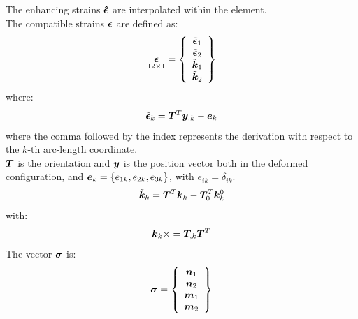 The enhancing strains $\T{\hat{\epsilon}}$ are interpolated within the element.\\
The compatible strains $\T{\epsilon}$ are defined as:
\begin{equation}
\underset{ 12 \times 1 }{
 \T{\epsilon}
 } =
\cubr{\vvect{c}{
 \tilde{\T{\epsilon}}_1 \\
 \tilde{\T{\epsilon}}_2 \\
 \tilde{\T{k} }_1 \\
 \tilde{\T{k} }_2 \\
}}
\end{equation}
where:
\begin{equation}
\tilde{\T{\epsilon}}_k =
\TT{T} ^T \T{y}_{,k}  - \T{e}_k
\label{eq:epsilon}
\end{equation}
where the comma followed by the index represents the derivation with respect to the $k$-th arc-length coordinate.\\
$\TT{T}$ is the orientation and $\T{y}$ is the position vector both in the deformed configuration, and $\T{e}_k=\{e_{1k},e_{2k},e_{3k}\}$, with
$e_{ik}=\delta_{ik}$.
\begin{equation}
\tilde{\T{k}}_k  =
\TT{T}^ T \T{k}_k  - \TT{T}_0 ^ T  \T{k}^{0}_{k}
\end{equation}
with:
\begin{equation}
\T{k}_k  \times = \TT{T}_{,k} \TT{T}^T
\end{equation}
The vector $\T{\sigma}$ is:
\begin{equation}
 \T{\sigma} =
\cubr{\vvect{c}{
 \T{n}_1 \\
 \T{n}_2 \\
 \T{m}_1 \\
 \T{m}_2 \\
}}
\end{equation}
